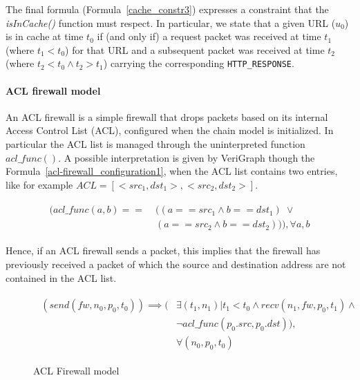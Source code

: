 The final formula (Formula~\ref{cache_constr3}) expresses a constraint that the \textit{isInCache()} function must respect. In particular, we state that a given URL ($u_{0}$) is in cache at time $t_{0}$ if (and only if) a request packet was received at time $t_{1}$ (where $t_{1} < t_{0}$) for that URL and a subsequent packet was received at time $t_{2}$ (where $t_{2} < t_{0} \wedge t_{2} > t_{1}$) carrying the corresponding \texttt{HTTP\_RESPONSE}.

\paragraph{ACL firewall model} An ACL firewall is a simple firewall that drops packets based on its internal Access Control List (ACL), configured when the chain model is initialized. In particular the ACL list is managed through the uninterpreted function \textit{$acl\_func()$}. A possible interpretation is given by VeriGraph though the Formula~\ref{acl-firewall_configuration1}, when the ACL list contains two entries, like for example \textit{$ACL = [<src_1, dst_1>,<src_2,dst_2>]$}.
	\begin{figure}[h]
		{\footnotesize
			\begin{subequations}
				\begin{align}
					\begin{split}
						\label{acl-firewall_configuration1}
						(acl\_func(a, b) == \;& ((a == src_1 \wedge b == dst_1 ) \; \vee \\
						& (a == src_2 \wedge b == dst_2))), \forall a, b
					\end{split}
				\end{align}
			\end{subequations}
		}%
	\end{figure}


Hence, if an ACL firewall sends a packet, this implies that the firewall has previously received a packet of which the source and destination address are not contained in the ACL list.
\begin{figure}[h]
	{\footnotesize
		\begin{subequations}
			\begin{align}
				\begin{split}
					\label{acl-fw_constr1}
					(send(fw, n_{0}, p_{0}, t_{0})) \implies (&\exists (t_{1}, n_{1}) | t_{1} < t_{0} \wedge recv(n_{1}, fw, p_{0}, t_{1}) \wedge \\
					&\neg acl\_func(p_{0}.src, p_{0}.dst)), \\
					& \forall (n_{0}, p_{0}, t_{0})
				\end{split}
			\end{align}
		\end{subequations}
	}%
	\caption{ACL Firewall model}
	\label{acl-fw_model}
\end{figure}


